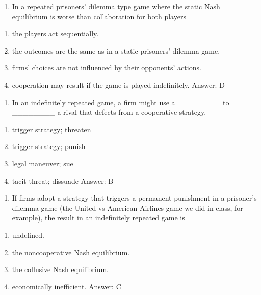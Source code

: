 \documentclass[11pt,]{article}
\providecommand{\tightlist}{%
  \setlength{\itemsep}{0pt}\setlength{\parskip}{0pt}}
\begin{document}
\begin{enumerate}
\def\labelenumi{\arabic{enumi})}
\setcounter{enumi}{2}
\tightlist
\item
  In a repeated prisoners' dilemma type game where the static Nash
  equilibrium is worse than collaboration for both players
\end{enumerate}

\begin{enumerate}
\def\labelenumi{\Alph{enumi})}
\tightlist
\item
  the players act sequentially.
\item
  the outcomes are the same as in a static prisoners' dilemma game.
\item
  firms' choices are not influenced by their opponents' actions.
\item
  cooperation may result if the game is played indefinitely. Answer: D
\end{enumerate}

\begin{enumerate}
\def\labelenumi{\arabic{enumi})}
\setcounter{enumi}{3}
\tightlist
\item
  In an indefinitely repeated game, a firm might use a \_\_\_\_\_\_\_\_
  to \_\_\_\_\_\_\_\_ a rival that defects from a cooperative strategy.
\end{enumerate}

\begin{enumerate}
\def\labelenumi{\Alph{enumi})}
\tightlist
\item
  trigger strategy; threaten
\item
  trigger strategy; punish
\item
  legal maneuver; sue
\item
  tacit threat; dissuade Answer: B
\end{enumerate}

\begin{enumerate}
\def\labelenumi{\arabic{enumi})}
\setcounter{enumi}{4}
\tightlist
\item
  If firms adopt a strategy that triggers a permanent punishment in a
  prisoner's dilemma game (the United vs American Airlines game we did
  in class, for example), the result in an indefinitely repeated game is
\end{enumerate}

\begin{enumerate}
\def\labelenumi{\Alph{enumi})}
\tightlist
\item
  undefined.
\item
  the noncooperative Nash equilibrium.
\item
  the collusive Nash equilibrium.
\item
  economically inefficient. Answer: C
\end{enumerate}
\end{document}
